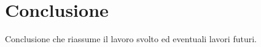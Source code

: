 \chapter*{Conclusione} %
Conclusione che riassume il lavoro svolto ed eventuali lavori futuri.

\blindtext %
\blindtext %